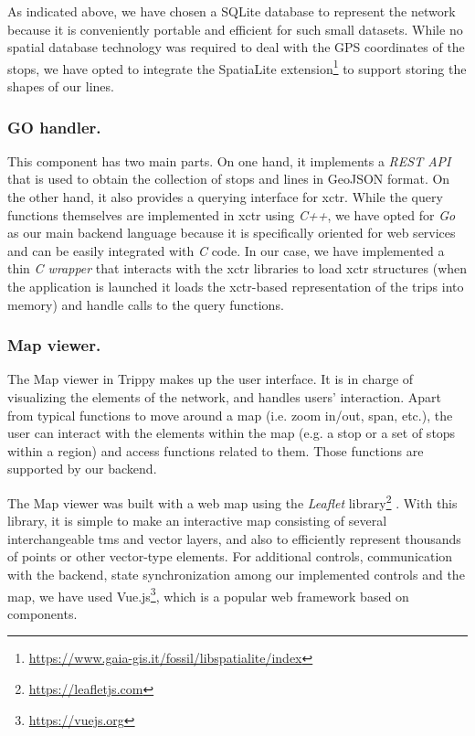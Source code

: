     As indicated above, we have chosen  a SQLite database to represent the network because it is conveniently portable and efficient for such small datasets. While no spatial database technology was required to deal with the GPS coordinates of the  stops, we have opted to integrate the  SpatiaLite extension\footnote{\url{https://www.gaia-gis.it/fossil/libspatialite/index}} to support storing the shapes of our lines.
    
    \subsubsection{\bf GO handler.}
    This component has two main parts. On one hand, it implements a {\em REST API} that is used to obtain the collection of stops and lines in GeoJSON format. On the other hand, it also provides a querying interface for \gls{xctr}. While the query functions themselves are implemented in \gls{xctr} using {\em C++}, we have opted for {\em Go} as our main backend language because it is specifically oriented for web services and can be easily integrated with {\em C} code. In our case, we have implemented a thin {\em C wrapper} that interacts with the \gls{xctr} libraries to load \gls{xctr} structures (when the application is launched it loads the \gls{xctr}-based representation of the trips into memory) and handle calls to the query functions.
    
    \subsubsection{\bf Map viewer.}
    The Map viewer in Trippy makes up the user interface. It is in charge of visualizing the elements of the network, and handles users’ interaction. Apart from typical functions to move around a map (i.e. zoom in/out, span, etc.), the user can interact with the elements within the map (e.g. a stop or a set of stops within a region) and access functions related to them. Those functions are supported by our backend.
    
    The Map viewer was built with a web map using the {\em Leaflet} library\footnote{\url{https://leafletjs.com}} . With this library, it is simple to make an interactive map consisting of several interchangeable \gls{tms} and vector layers, and also to efficiently represent thousands of points or other vector-type elements.
    For additional controls, communication with the backend, state synchronization among our implemented controls and the map, we have used Vue.js\footnote{\url{https://vuejs.org}}, which is a popular web framework based on components.

